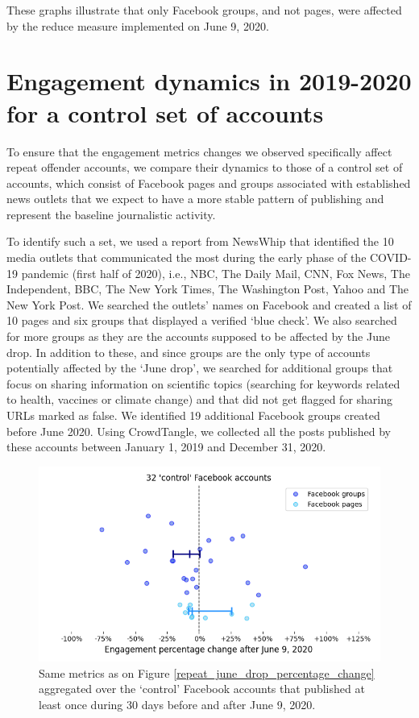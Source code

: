 \documentclass[review]{elsarticle}
\begin{document}
{{These graphs illustrate that only Facebook groups, and not pages, were affected by the reduce measure implemented on June 9, 2020.

\section*{Engagement dynamics in 2019-2020 for a control set of accounts}

To ensure that the engagement metrics changes we observed specifically affect repeat offender accounts, we compare their dynamics to those of a control set of accounts, which consist of Facebook pages and groups associated with established news outlets that we expect to have a more stable pattern of publishing and represent the baseline journalistic activity. 

To identify such a set, we used a report from NewsWhip \citep{NewsWhipReport} that identified the 10 media outlets that communicated the most during the early phase of the COVID-19 pandemic (first half of 2020), i.e., NBC, The Daily Mail, CNN, Fox News, The Independent, BBC, The New York Times, The Washington Post, Yahoo and The New York Post.
We searched the outlets' names on Facebook and created a list of 10 pages and six groups that displayed a verified `blue check'.
We also searched for more groups as they are the accounts supposed to be affected by the June drop.
In addition to these, and since  groups are the only type of accounts potentially affected by the `June drop', we searched for additional groups that focus on sharing information on scientific topics (searching for keywords related to health, vaccines or climate change) and that did not get flagged for sharing URLs marked as false.
We identified 19 additional Facebook groups created before June 2020.
Using CrowdTangle, we collected all the posts published by these accounts between January 1, 2019 and December 31, 2020.

\begin{figure}[!h]
\centering
\includegraphics[scale=0.5]{./../figure/supplementary_mainstream_june_drop_percentage_change.png}
\caption{
Same metrics as on Figure \ref{repeat_june_drop_percentage_change} aggregated over the `control' Facebook accounts that published at least once during 30 days before and after June 9, 2020.
}
\label{june_drop_control}
\end{figure}

}}
\end{document}
